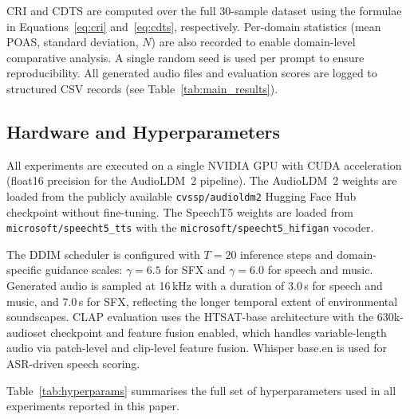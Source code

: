 \documentclass[journal]{IEEEtran}
\begin{document}
CRI and CDTS are computed over the full 30-sample dataset using the
formulae in Equations~\eqref{eq:cri} and~\eqref{eq:cdts},
respectively. Per-domain statistics (mean POAS, standard deviation, $N$)
are also recorded to enable domain-level comparative analysis.
A single random seed is used per prompt to ensure reproducibility.
All generated audio files and evaluation scores are logged to
structured CSV records (see Table~\ref{tab:main_results}).

\subsection{Hardware and Hyperparameters}

All experiments are executed on a single NVIDIA GPU with CUDA
acceleration (float16 precision for the AudioLDM~2 pipeline). The
AudioLDM~2 weights are loaded from the publicly available
\texttt{cvssp/audioldm2} Hugging Face Hub checkpoint without
fine-tuning. The SpeechT5 weights are loaded from
\texttt{microsoft/speecht5\_tts} with the
\texttt{microsoft/speecht5\_hifigan} vocoder.

The DDIM scheduler is configured with $T = 20$ inference steps and
domain-specific guidance scales: $\gamma = 6.5$ for SFX and
$\gamma = 6.0$ for speech and music. Generated audio is sampled at
16\,kHz with a duration of 3.0\,s for speech and music, and 7.0\,s
for SFX, reflecting the longer temporal extent of environmental
soundscapes. CLAP evaluation uses the HTSAT-base architecture with
the 630k-audioset checkpoint and feature fusion enabled, which handles
variable-length audio via patch-level and clip-level feature fusion.
Whisper base.en is used for ASR-driven speech scoring.

Table~\ref{tab:hyperparams} summarises the full set of hyperparameters
used in all experiments reported in this paper.
\end{document}
